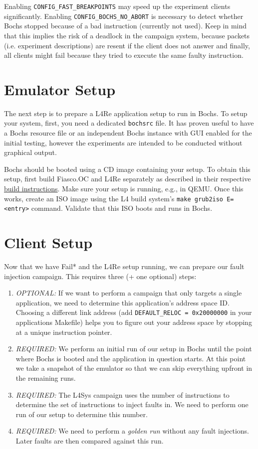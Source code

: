 \documentclass[a4paper,times,9pt]{article}
\newcommand{\lfs}{L4Sys}
\begin{document}
Enabling \verb+CONFIG_FAST_BREAKPOINTS+ may speed up the experiment clients
significantly. Enabling \verb+CONFIG_BOCHS_NO_ABORT+ is necessary to detect
whether Bochs stopped because of a bad instruction (currently not used).
Keep in mind that this implies the risk of a deadlock
in the campaign system, because packets (i.e. experiment descriptions)
are resent if the client does not answer and finally, all clients
might fail because they tried to execute the same faulty instruction.

\section{Emulator Setup}

The next step is to prepare a L4Re application setup to run in Bochs.  To
setup your system, first, you need a dedicated \texttt{bochsrc} file.  It has
proven useful to have a Bochs resource file or an independent Bochs instance
with GUI enabled for the initial testing, however the experiments are intended
to be conducted without graphical output.

Bochs should be booted using a CD image containing your setup. To obtain this
setup, first build Fiasco.OC and L4Re separately as described in their
respective \href{https://os.inf.tu-dresden.de/L4Re/build.html}{build
instructions}. Make sure your setup is running, e.g., in QEMU. Once this
works, create an ISO image using the L4 build system's 
\verb+make grub2iso E=<entry>+ command. Validate that this ISO boots and runs
in Bochs.


\section{Client Setup}

Now that we have Fail* and the L4Re setup running, we can prepare our fault
injection campaign. This requires three (+ one optional) steps:
\begin{enumerate}[topsep=0em,itemsep=0em]
  \item \emph{OPTIONAL:} If we want to perform a campaign that only targets
        a single application, we need to determine this application's address
        space ID. Choosing a different link address (add
				\verb+DEFAULT_RELOC = 0x20000000+ in your applications Makefile)
				helps you to figure out your address space by stopping at a unique
				instruction pointer.
  \item \emph{REQUIRED:} We perform an initial run of our setup in Bochs until
        the point where Bochs is booted and the application in question
        starts. At this point we take a snapshot of the emulator so that we
        can skip everything upfront in the remaining runs.
  \item \emph{REQUIRED:} The \lfs{} campaign uses the number of instructions to
        determine the set of instructions to inject faults in. We need to
        perform one run of our setup to determine this number.
  \item \emph{REQUIRED:} We need to perform a \emph{golden run} without any
        fault injections. Later faults are then compared against this run.
\end{enumerate}
\end{document}
